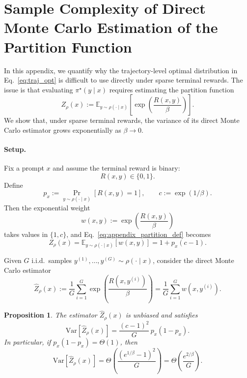 \documentclass{article}
\newtheorem{proposition}{Proposition}[section]
\begin{document}
\section{Sample Complexity of Direct Monte Carlo Estimation of the Partition Function}
\label{app:z_estimation}

In this appendix, we quantify why the trajectory-level optimal distribution in Eq.~\eqref{eq:traj_opt} is difficult to use directly under sparse terminal rewards. The issue is that evaluating $\pi^\star(y \mid x)$ requires estimating the partition function
\begin{equation}
Z_\rho(x)
:=
\mathbb{E}_{y \sim \rho(\cdot \mid x)}
\left[
\exp\!\left(\frac{R(x,y)}{\beta}\right)
\right].
\label{eq:appendix_partition_def}
\end{equation}
We show that, under sparse terminal rewards, the variance of its direct Monte Carlo estimator grows exponentially as $\beta \to 0$.

\paragraph{Setup.}
Fix a prompt $x$ and assume the terminal reward is binary:
\begin{equation}
R(x,y) \in \{0,1\}.
\end{equation}
Define
\begin{equation}
p_x := \Pr_{y \sim \rho(\cdot \mid x)}[R(x,y)=1],
\qquad
c := \exp(1/\beta).
\end{equation}
Then the exponential weight
\begin{equation}
w(x,y) := \exp\!\left(\frac{R(x,y)}{\beta}\right)
\end{equation}
takes values in $\{1,c\}$, and Eq.~\eqref{eq:appendix_partition_def} becomes
\begin{equation}
Z_\rho(x)
=
\mathbb{E}_{y \sim \rho(\cdot \mid x)}[w(x,y)]
=
1 + p_x(c-1).
\label{eq:appendix_partition_binary}
\end{equation}

Given $G$ i.i.d.\ samples $y^{(1)},\ldots,y^{(G)} \sim \rho(\cdot \mid x)$, consider the direct Monte Carlo estimator
\begin{equation}
\widehat{Z}_\rho(x)
:=
\frac{1}{G}\sum_{i=1}^G
\exp\!\left(\frac{R(x,y^{(i)})}{\beta}\right)
=
\frac{1}{G}\sum_{i=1}^G w(x,y^{(i)}).
\label{eq:appendix_z_hat}
\end{equation}

\begin{proposition}
\label{prop:z_variance}
The estimator $\widehat{Z}_\rho(x)$ is unbiased and satisfies
\begin{equation}
\mathrm{Var}\!\left[\widehat{Z}_\rho(x)\right]
=
\frac{(c-1)^2}{G}\,p_x(1-p_x).
\label{eq:appendix_z_variance}
\end{equation}
In particular, if $p_x(1-p_x)=\Theta(1)$, then
\begin{equation}
\mathrm{Var}\!\left[\widehat{Z}_\rho(x)\right]
=
\Theta\!\left(\frac{(e^{1/\beta}-1)^2}{G}\right)
=
\Theta\!\left(\frac{e^{2/\beta}}{G}\right).
\label{eq:appendix_z_variance_asym}
\end{equation}
\end{proposition}
\end{document}
